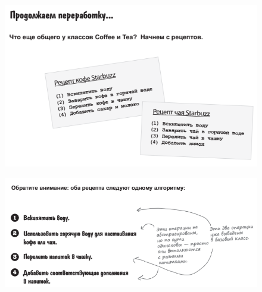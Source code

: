 \documentclass{beamer}
\begin{document}
\begin{frame}
\begin{figure}[h]
\centering
\includegraphics[scale=0.6]{images/lec12-pic07.png}
\label{pic-sort}
\end{figure}
\end{frame}

\begin{frame}
\begin{figure}[h]
\centering
\includegraphics[scale=0.6]{images/lec12-pic08.png}
\label{pic-sort}
\end{figure}
\end{frame}
\end{document}
